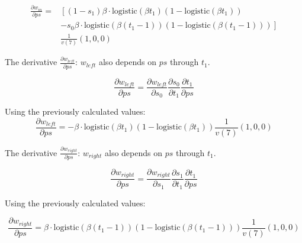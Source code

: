 \documentclass[11pt]{article}
\begin{document}
                \begin{equation}
                    \begin{split}
                    \frac{\partial w_{in}}{\partial ps} = &\left[(1 - s_1)\beta \cdot \text{logistic}(\beta t_1)(1 - \text{logistic}(\beta t_1)) \right. \\
                    &\left. - s_0\beta \cdot \text{logistic}(\beta (t_1 - 1))(1 - \text{logistic}(\beta (t_1 - 1)))\right] \\
                    &\frac{1}{v(7)} (1, 0, 0)
                    \end{split}
                \end{equation}


                The derivative $\frac{\partial w_{left}}{\partial ps}$: $w_{left}$ also depends on $ps$ through $t_1$.

                \begin{equation}
                    \frac{\partial w_{left}}{\partial ps} = \frac{\partial w_{left}}{\partial s_0} \frac{\partial s_0}{\partial t_1} \frac{\partial t_1}{\partial ps}
                \end{equation}

                Using the previously calculated values:
                \begin{equation}
                    \frac{\partial w_{left}}{\partial ps} = -\beta \cdot \text{logistic}(\beta t_1)(1 - \text{logistic}(\beta t_1))  \frac{1}{v(7)} (1, 0, 0)
                \end{equation}

                The derivative $\frac{\partial w_{right}}{\partial ps}$: $w_{right}$ also depends on $ps$ through $t_1$.

                \begin{equation}
                    \frac{\partial w_{right}}{\partial ps} = \frac{\partial w_{right}}{\partial s_1} \frac{\partial s_1}{\partial t_1} \frac{\partial t_1}{\partial ps}
                \end{equation}

                Using the previously calculated values:

                \begin{equation}
                    \frac{\partial w_{right}}{\partial ps} =  \beta \cdot \text{logistic}(\beta (t_1 - 1))(1 - \text{logistic}(\beta (t_1 - 1))) \frac{1}{v(7)} (1, 0, 0)
                \end{equation}
\end{document}
